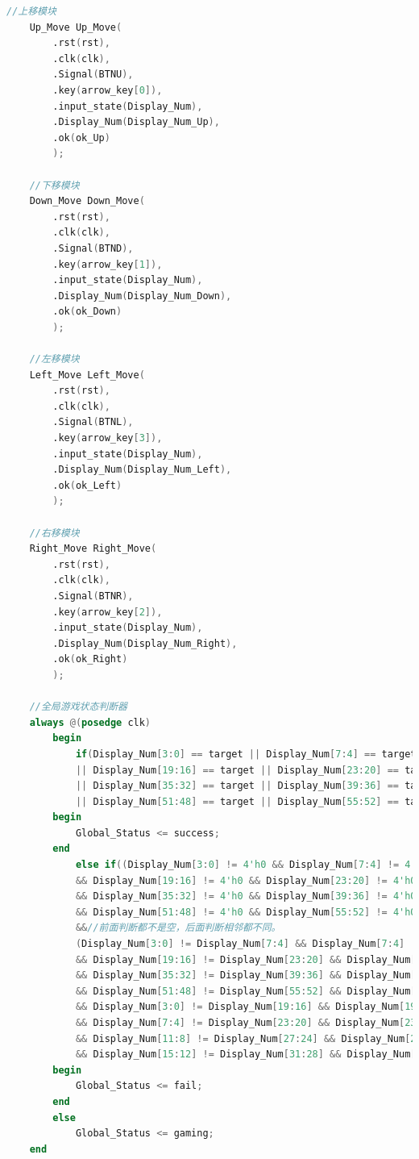 \documentclass[UTF8]{article}
\begin{document}
\begin{lstlisting}[language=Verilog]
	//上移模块
	Up_Move Up_Move(
		.rst(rst),
		.clk(clk),
		.Signal(BTNU),
		.key(arrow_key[0]),
		.input_state(Display_Num),
		.Display_Num(Display_Num_Up),
		.ok(ok_Up)
		);
	
	//下移模块
	Down_Move Down_Move(
		.rst(rst),
		.clk(clk),
		.Signal(BTND),
		.key(arrow_key[1]),
		.input_state(Display_Num),
		.Display_Num(Display_Num_Down),
		.ok(ok_Down)
		);
	
	//左移模块
	Left_Move Left_Move(
		.rst(rst),
		.clk(clk),
		.Signal(BTNL),
		.key(arrow_key[3]),
		.input_state(Display_Num),
		.Display_Num(Display_Num_Left),
		.ok(ok_Left)
		);
	
	//右移模块
	Right_Move Right_Move(
		.rst(rst),
		.clk(clk),
		.Signal(BTNR),
		.key(arrow_key[2]),
		.input_state(Display_Num),
		.Display_Num(Display_Num_Right),
		.ok(ok_Right)
		);
	
	//全局游戏状态判断器
	always @(posedge clk)
		begin
			if(Display_Num[3:0] == target || Display_Num[7:4] == target || Display_Num[11:8] == target || Display_Num[15:12] == target
			|| Display_Num[19:16] == target || Display_Num[23:20] == target || Display_Num[27:24] == target || Display_Num[31:28] == target
			|| Display_Num[35:32] == target || Display_Num[39:36] == target || Display_Num[43:40] == target || Display_Num[47:44] == target
			|| Display_Num[51:48] == target || Display_Num[55:52] == target || Display_Num[59:56] == target || Display_Num[63:60] == target)
		begin
			Global_Status <= success;
		end
			else if((Display_Num[3:0] != 4'h0 && Display_Num[7:4] != 4'h0 && Display_Num[11:8] != 4'h0 && Display_Num[15:12] != 4'h0
			&& Display_Num[19:16] != 4'h0 && Display_Num[23:20] != 4'h0 && Display_Num[27:24] != 4'h0 && Display_Num[31:28] != 4'h0
			&& Display_Num[35:32] != 4'h0 && Display_Num[39:36] != 4'h0 && Display_Num[43:40] != 4'h0 && Display_Num[47:44] != 4'h0
			&& Display_Num[51:48] != 4'h0 && Display_Num[55:52] != 4'h0 && Display_Num[59:56] != 4'h0 && Display_Num[63:60] != 4'h0)
			&&//前面判断都不是空，后面判断相邻都不同。
			(Display_Num[3:0] != Display_Num[7:4] && Display_Num[7:4] != Display_Num[11:8] && Display_Num[11:8] != Display_Num[15:12]
			&& Display_Num[19:16] != Display_Num[23:20] && Display_Num[23:20] != Display_Num[27:24] && Display_Num[27:24] != Display_Num[31:28]
			&& Display_Num[35:32] != Display_Num[39:36] && Display_Num[39:36] != Display_Num[43:40] && Display_Num[43:40] != Display_Num[47:44]
			&& Display_Num[51:48] != Display_Num[55:52] && Display_Num[55:52] != Display_Num[59:56] && Display_Num[59:56] != Display_Num[63:60]
			&& Display_Num[3:0] != Display_Num[19:16] && Display_Num[19:16] != Display_Num[35:32] && Display_Num[35:32] != Display_Num[51:48]
			&& Display_Num[7:4] != Display_Num[23:20] && Display_Num[23:20] != Display_Num[39:36] && Display_Num[39:36] != Display_Num[55:52]
			&& Display_Num[11:8] != Display_Num[27:24] && Display_Num[27:24] != Display_Num[43:40] && Display_Num[43:40] != Display_Num[59:56]
			&& Display_Num[15:12] != Display_Num[31:28] && Display_Num[31:28] != Display_Num[47:44] && Display_Num[47:44] != Display_Num[63:60]))
		begin
			Global_Status <= fail;
		end
		else
			Global_Status <= gaming;
	end
	

\end{lstlisting}
\end{document}
